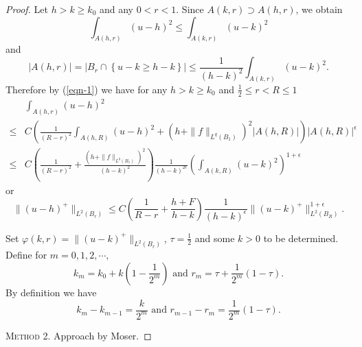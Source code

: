 \begin{proof}
Let $h>k\ge k_0$ and any $0<r<1$. Since $A(k,r)\supset A(h,r)$, we obtain
\[
  \int_{A(h,r)}(u-h)^2\le \int _{A(k,r)}(u-k)^2
\] 
and
\[
  |A(h,r)|=|B_r\cap \left\{u-k\ge h-k\right\} |\le \frac{1}{(h-k)^2}\int_{A(k,r)}(u-k)^2.
\]
Therefore by (\ref{eqn-1}) we have for any $h>k\ge k_0$ and $\frac{1}{2}\le r<R\le 1$
\begin{align*}
  &\int_{A(h,r)}(u-h)^2\\
  \le & C\left( \frac{1}{(R-r)^2}\int_{A(h,R)}(u-h)^2+(h+\|f\|_{L^{q}(B_1)})^2 |A(h,R)| \right) |A(h,R)|^{\epsilon }\\
  \le & C\left( \frac{1}{(R-r)^2}+ \frac{(h+\|f\|_{L^{q}(B_1)})^2}{(h-k)^2} \right)\frac{1}{(h-k)^{2\epsilon }}\left( \int_{A(k,R)}(u-k)^2 \right) ^{1+\epsilon } 
\end{align*}
or 
\begin{equation}
  \|(u-h)^{+}\|_{L^2(B_r)}\le C\left( \frac{1}{R-r}+\frac{h+F}{h-k} \right) \frac{1}{(h-k)^{\epsilon }}\|(u-k)^{+}\|_{L^2(B_R)}^{1+\epsilon }.
\end{equation}

Set $\varphi(k,r)=\|(u-k)^{+}\|_{L^2(B_r)}$, $\tau =\frac{1}{2}$ and some $k>0$ to be determined. Define for $m=0,1,2,\cdots ,$
\[
  k_m=k_0+k(1-\frac{1}{2^{m}})\text{ and } r_m=\tau +\frac{1}{2^{m}}(1-\tau ).
\] 
By definition we have
\[
  k_m-k_{m-1}=\frac{k}{2^{m}} \text{ and }r_{m-1}-r_{m}=\frac{1}{2^{m}}(1-\tau ). 
\] 






\textsc{Method 2.} Approach by Moser.




\end{proof}
